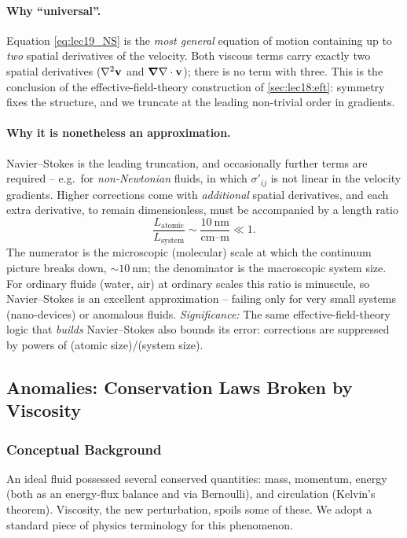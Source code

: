 \documentclass[../main.tex]{subfiles}
\begin{document}
\paragraph{Why ``universal''.} Equation \eqref{eq:lec19_NS} is the \emph{most general} equation of motion containing up to \emph{two} spatial derivatives of the velocity. Both viscous terms carry exactly two spatial derivatives ($\nabla^2\mathbf{v}$ and $\grad\nabla \cdot\mathbf{v}$); there is no term with three. This is the conclusion of the effective-field-theory construction of \cref{sec:lec18:eft}: symmetry fixes the structure, and we truncate at the leading non-trivial order in gradients.

\paragraph{Why it is nonetheless an approximation.} Navier--Stokes is the leading truncation, and occasionally further terms are required -- e.g.\ for \emph{non-Newtonian} fluids, in which $\sigma'_{ij}$ is not linear in the velocity gradients. Higher corrections come with \emph{additional} spatial derivatives, and each extra derivative, to remain dimensionless, must be accompanied by a length ratio
\begin{equation}
  \frac{L_{\text{atomic}}}{L_{\text{system}}}\sim\frac{10\ \mathrm{nm}}{\text{cm}\text{--}\text{m}}\ll 1 .
  \label{eq:lec19_smallness}
\end{equation}
The numerator is the microscopic (molecular) scale at which the continuum picture breaks down, $\sim10\ \mathrm{nm}$; the denominator is the macroscopic system size. For ordinary fluids (water, air) at ordinary scales this ratio is minuscule, so Navier--Stokes is an excellent approximation -- failing only for very small systems (nano-devices) or anomalous fluids.
\textit{Significance:} The same effective-field-theory logic that \emph{builds} Navier--Stokes also bounds its error: corrections are suppressed by powers of (atomic size)/(system size).

\subsection{Anomalies: Conservation Laws Broken by Viscosity}\label{sec:lec19:anomaly}

\subsubsection*{Conceptual Background}
An ideal fluid possessed several conserved quantities: mass, momentum, energy (both as an energy-flux balance and via Bernoulli), and circulation (Kelvin's theorem). Viscosity, the new perturbation, spoils some of these. We adopt a standard piece of physics terminology for this phenomenon.
\end{document}
